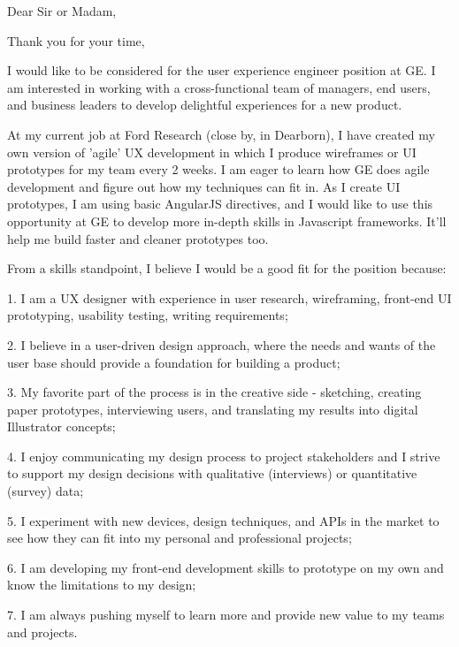\documentclass[10pt,a4paper,sans]{moderncv}        %
\begin{document}
\date{October 10, 2014}
\opening{Dear Sir or Madam,}
\closing{Thank you for your time,}
\makelettertitle

I would like to be considered for the user experience engineer position at GE.  I am interested in working with a cross-functional team of managers, end users, and business leaders to develop delightful experiences for a new product.  

At my current job at Ford Research (close by, in Dearborn), I have created my own version of 'agile' UX development in which I produce wireframes or UI prototypes for my team every 2 weeks.  I am eager to learn how GE does agile development and figure out how my techniques can fit in.  As I create UI prototypes, I am using basic AngularJS directives, and I would like to use this opportunity at GE to develop more in-depth skills in Javascript frameworks. It'll help me build faster and cleaner prototypes too.  
\smallskip

 From a skills standpoint, I believe I would be a good fit for the position because:


1. I am a UX designer with experience in user research, wireframing, front-end UI prototyping, usability testing, writing requirements;

2. I believe in a user-driven design approach, where the needs and wants of the user base should provide a foundation for building a product;

3.  My favorite part of the process is in the creative side - sketching, creating paper prototypes, interviewing users, and translating my results into digital Illustrator concepts;

4. I enjoy communicating my design process to project stakeholders and I strive to support my design decisions with qualitative (interviews) or quantitative (survey) data;

5. I experiment with new devices, design techniques, and APIs in the market to see how they can fit into my personal and professional projects;

6. I am developing my front-end development skills to prototype on my own and  know the limitations to my design;

7. I am always pushing myself to learn more and provide new value to my teams and projects.

\bigskip
\end{document}
